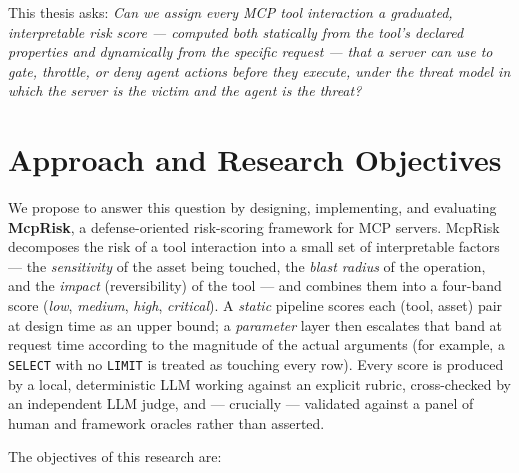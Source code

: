This thesis asks: \emph{Can we assign every MCP tool interaction a graduated,
interpretable risk score --- computed both statically from the tool's declared
properties and dynamically from the specific request --- that a server can use
to gate, throttle, or deny agent actions before they execute, under the
threat model in which the server is the victim and the agent is the threat?}

\section{Approach and Research Objectives}
\label{sec:intro:contributions}

We propose to answer this question by designing, implementing, and evaluating
\textbf{McpRisk}, a defense-oriented risk-scoring framework for MCP servers.
McpRisk decomposes the risk of a tool interaction into a small set of
interpretable factors --- the \emph{sensitivity} of the asset being touched,
the \emph{blast radius} of the operation, and the \emph{impact}
(reversibility) of the tool --- and combines them into a four-band score
(\textit{low}, \textit{medium}, \textit{high}, \textit{critical}). A
\emph{static} pipeline scores each (tool, asset) pair at design time as an
upper bound; a \emph{parameter} layer then escalates that band at request time
according to the magnitude of the actual arguments (for example, a
\texttt{SELECT} with no \texttt{LIMIT} is treated as touching every row). Every
score is produced by a local, deterministic LLM working against an explicit
rubric, cross-checked by an independent LLM judge, and --- crucially ---
validated against a panel of human and framework oracles rather than asserted.

The objectives of this research are:

